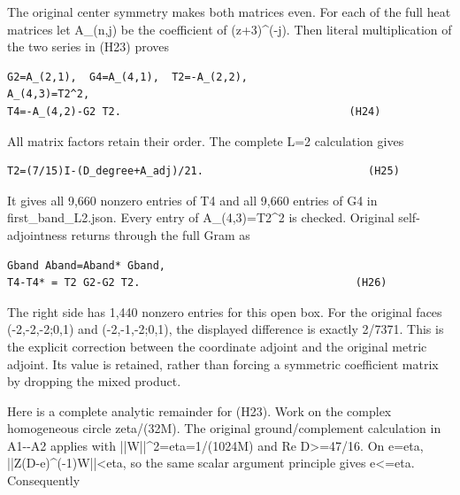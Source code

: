 \documentclass[11pt,a4paper]{article}
\renewcommand{\[}{\begingroup\small\originaldisplaystart}
\renewcommand{\]}{\originaldisplayend\endgroup}
\begin{document}
The original center symmetry makes both matrices even. For each of the
full heat matrices let A\_(n,j) be the coefficient of (z+3)\^{}(-j).
Then literal multiplication of the two series in (H23) proves

\begin{verbatim}
G2=A_(2,1),  G4=A_(4,1),  T2=-A_(2,2),
A_(4,3)=T2^2,
T4=-A_(4,2)-G2 T2.                                    (H24)
\end{verbatim}

All matrix factors retain their order. The complete L=2 calculation
gives

\begin{verbatim}
T2=(7/15)I-(D_degree+A_adj)/21.                          (H25)
\end{verbatim}

It gives all 9,660 nonzero entries of T4 and all 9,660 entries of G4 in
{f\allowbreak{}i\allowbreak{}r\allowbreak{}s\allowbreak{}t\allowbreak{}\_\allowbreak{}b\allowbreak{}a\allowbreak{}n\allowbreak{}d\allowbreak{}\_\allowbreak{}L\allowbreak{}2\allowbreak{}.\allowbreak{}j\allowbreak{}s\allowbreak{}o\allowbreak{}n\allowbreak{}.\allowbreak{}}
Every entry of A\_(4,3)=T2\^{}2 is checked. Original self-adjointness
returns through the full Gram as

\begin{verbatim}
Gband Aband=Aband* Gband,
T4-T4* = T2 G2-G2 T2.                                  (H26)
\end{verbatim}

The right side has 1,440 nonzero entries for this open box. For the
original faces (-2,-2,-2;0,1) and (-2,-1,-2;0,1), the displayed
difference is exactly 2/7371. This is the explicit correction between
the coordinate adjoint and the original metric adjoint. Its value is
retained, rather than forcing a symmetric coefficient matrix by dropping
the mixed product.

Here is a complete analytic remainder for (H23). Work on the complex
homogeneous circle \textbar zeta/(32M). The original
ground/complement calculation in A1-\/-A2 applies with
{|\allowbreak{}|\allowbreak{}W\allowbreak{}|\allowbreak{}|\allowbreak{}\textasciicircum{}\allowbreak{}2\allowbreak{}=\allowbreak{}e\allowbreak{}t\allowbreak{}a\allowbreak{}=\allowbreak{}1\allowbreak{}/\allowbreak{}(\allowbreak{}1\allowbreak{}0\allowbreak{}2\allowbreak{}4\allowbreak{}M\allowbreak{})\allowbreak{}}
and Re D\textgreater=47/16. On \textbar e\textbar=eta,
{|\allowbreak{}|\allowbreak{}Z\allowbreak{}(\allowbreak{}D\allowbreak{}-\allowbreak{}e\allowbreak{})\allowbreak{}\textasciicircum{}\allowbreak{}(\allowbreak{}-\allowbreak{}1\allowbreak{})\allowbreak{}W\allowbreak{}|\allowbreak{}|\allowbreak{}\textless{}\allowbreak{}e\allowbreak{}t\allowbreak{}a\allowbreak{},\allowbreak{}}
so the same scalar argument principle gives
\textbar e\textbar\textless=eta. Consequently
\end{document}

